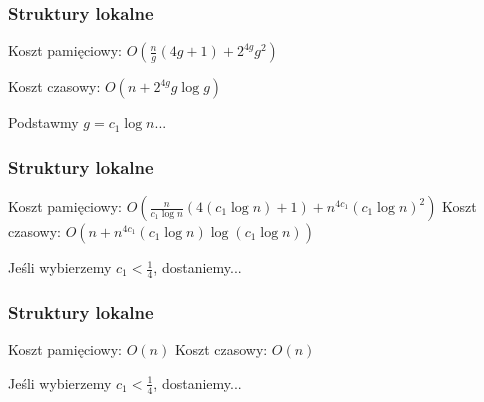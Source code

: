 \documentclass{beamer}
\begin{document}
\begin{frame} \frametitle{Struktury lokalne}
 Koszt pamięciowy: $O(\frac{n}{g} (4g + 1) + 2^{4g} g^2)$
 
 Koszt czasowy: $O(n + 2^{4g} g \log g)$
 
 Podstawmy $g=c_1 \log n$...
\end{frame}

\begin{frame} \frametitle{Struktury lokalne}
 Koszt pamięciowy: $O(\frac{n}{c_1 \log n} (4(c_1 \log n) + 1) + n^{4 c_1} (c_1 \log n)^2)$
 Koszt czasowy: $O(n + n^{4 c_1} (c_1 \log n) \log (c_1 \log n))$
 
 Jeśli wybierzemy $c_1 < \frac{1}{4}$, dostaniemy...
\end{frame}

\begin{frame} \frametitle{Struktury lokalne}
 Koszt pamięciowy: $O(n)$
 Koszt czasowy: $O(n)$
 
 Jeśli wybierzemy $c_1 < \frac{1}{4}$, dostaniemy...
\end{frame}
\end{document}
